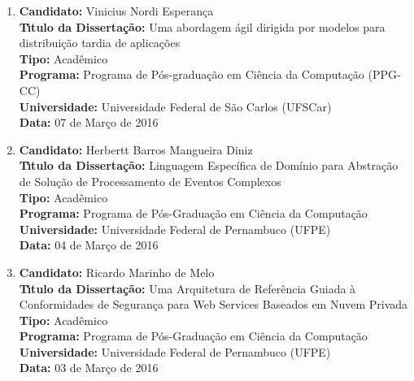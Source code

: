 \documentclass[a4paper,oneside,10pt]{article}
\begin{document}
\begin{enumerate}
\renewcommand{\labelenumi}{{\large\bfseries\arabic{enumi}.}}
\vspace{0.3cm}

\item       \textbf{Candidato:} Vinicius Nordi Esperança \colorbox{yellow}{\mbox{}}\\
            \textbf{T\'{\i}tulo da Disserta\c{c}\~{a}o:} Uma abordagem ágil dirigida por modelos para distribuição tardia de aplicações\\
            \textbf{Tipo:} Acadêmico\\
            \textbf{Programa:} Programa de Pós-graduação em Ciência da Computação (PPG-CC)\\
            \textbf{Universidade:} Universidade Federal de São Carlos (UFSCar)\\
            \textbf{Data:} 07 de Março de 2016

\item       \textbf{Candidato:} Herbertt Barros Mangueira Diniz \mbox{}\\
            \textbf{T\'{\i}tulo da Disserta\c{c}\~{a}o:} Linguagem Específica de Domínio para Abstração de Solução de Processamento de Eventos Complexos\\
            \textbf{Tipo:} Acadêmico\\
            \textbf{Programa:} Programa de Pós-Graduação em Ciência da Computação\\
            \textbf{Universidade:} Universidade Federal de Pernambuco (UFPE)\\
            \textbf{Data:} 04 de Março de 2016

\item       \textbf{Candidato:} Ricardo Marinho de Melo \mbox{}\\
            \textbf{T\'{\i}tulo da Disserta\c{c}\~{a}o:} Uma Arquitetura de Referência Guiada à Conformidades de Segurança para Web Services Baseados em Nuvem Privada\\
            \textbf{Tipo:} Acadêmico\\
            \textbf{Programa:} Programa de Pós-Graduação em Ciência da Computação\\
            \textbf{Universidade:} Universidade Federal de Pernambuco (UFPE)\\
            \textbf{Data:} 03 de Março de 2016


\end{enumerate}
\end{document}
